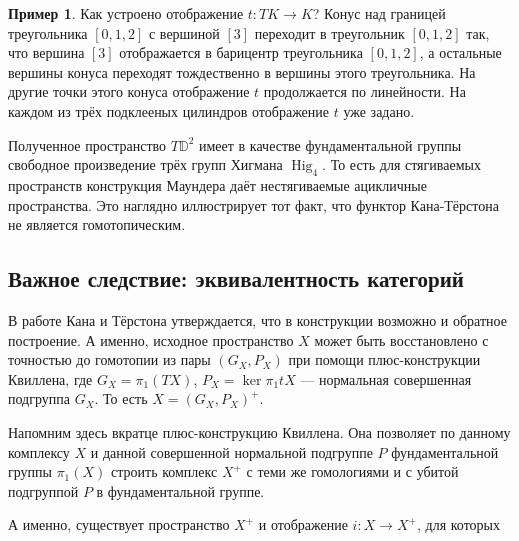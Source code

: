 \documentclass[14pt, dvipsnames]{extarticle}
\theoremstyle{definition}
\newtheorem{example}{Пример}
\theoremstyle{remark}
\DeclareMathOperator{\Hig}{\mathrm{Hig}}
\begin{document}
\begin{example}
Как устроено отображение $t: TK\to K$? Конус над границей треугольника $[0, 1, 2]$ с вершиной $[3]$ переходит в треугольник $[0, 1, 2]$ так, что вершина $[3]$ отображается в барицентр треугольника $[0, 1, 2]$, а остальные вершины конуса переходят тождественно в вершины этого треугольника. На другие точки этого конуса отображение $t$ продолжается по линейности. На каждом из трёх подклееных цилиндров отображение $t$ уже задано.    
 
Полученное пространство $T\mathbb{D}^2$ имеет в качестве фундаментальной группы свободное произведение трёх групп Хигмана $\Hig_4$. То есть для стягиваемых пространств конструкция Маундера даёт нестягиваемые ацикличные пространства. Это наглядно иллюстрирует тот факт, что функтор Кана-Тёрстона не является гомотопическим.








\end{example}






\subsection{Важное следствие: эквивалентность категорий}


В работе \cite{Kan} Кана и Тёрстона утверждается, что в конструкции возможно и обратное построение. А именно, исходное пространство $X$ может быть восстановлено с точностью до гомотопии из пары $(G_X, P_X)$ при помощи плюс-конструкции Квиллена, где $G_X = \pi_1(TX)$, $P_X = \ker \pi_1 t X$ --- нормальная совершенная подгруппа $G_X$. То есть $X = (G_X, P_X)^+$.

Напомним здесь вкратце плюс-конструкцию Квиллена. Она позволяет по данному комплексу $X$ и данной совершенной нормальной подгруппе $P$ фундаментальной группы $\pi_1(X)$ строить комплекс $X^+$ с теми же гомологиями и с убитой подгруппой $P$ в фундаментальной группе. 

А именно, существует пространство $X^+$ и отображение $i:X\to X^+$, для которых 
\end{document}
